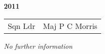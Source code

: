\begin{center}
  \Huge
  \textbf{2011}
\end{center}

\begin{center}
  \small
  \begin{tabular}{rl}
    Sqn Ldr & Maj P C Morris \\
  \end{tabular}
\end{center}

\begin{center}
  \textit{No further information}
\end{center}

\vspace{50mm}

\pagebreak

